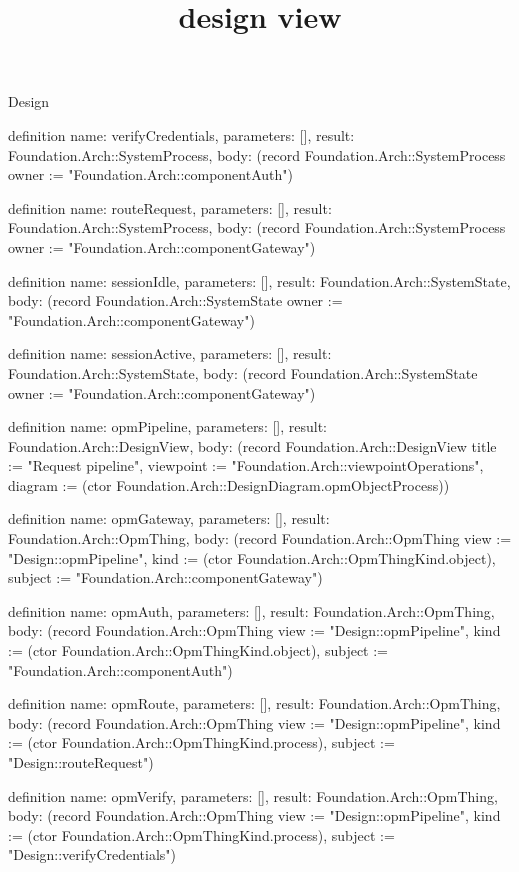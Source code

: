\begin{lexlean}{Design}
\title{design view}
\begin{semanticmodule}

definition{
  name: verifyCredentials,
  parameters: [],
  result: Foundation.Arch::SystemProcess,
  body: (record Foundation.Arch::SystemProcess {owner := "Foundation.Arch::componentAuth"})
}

definition{
  name: routeRequest,
  parameters: [],
  result: Foundation.Arch::SystemProcess,
  body: (record Foundation.Arch::SystemProcess {owner := "Foundation.Arch::componentGateway"})
}

definition{
  name: sessionIdle,
  parameters: [],
  result: Foundation.Arch::SystemState,
  body: (record Foundation.Arch::SystemState {owner := "Foundation.Arch::componentGateway"})
}

definition{
  name: sessionActive,
  parameters: [],
  result: Foundation.Arch::SystemState,
  body: (record Foundation.Arch::SystemState {owner := "Foundation.Arch::componentGateway"})
}

definition{
  name: opmPipeline,
  parameters: [],
  result: Foundation.Arch::DesignView,
  body: (record Foundation.Arch::DesignView {title := "Request pipeline", viewpoint := "Foundation.Arch::viewpointOperations", diagram := (ctor Foundation.Arch::DesignDiagram.opmObjectProcess)})
}

definition{
  name: opmGateway,
  parameters: [],
  result: Foundation.Arch::OpmThing,
  body: (record Foundation.Arch::OpmThing {view := "Design::opmPipeline", kind := (ctor Foundation.Arch::OpmThingKind.object), subject := "Foundation.Arch::componentGateway"})
}

definition{
  name: opmAuth,
  parameters: [],
  result: Foundation.Arch::OpmThing,
  body: (record Foundation.Arch::OpmThing {view := "Design::opmPipeline", kind := (ctor Foundation.Arch::OpmThingKind.object), subject := "Foundation.Arch::componentAuth"})
}

definition{
  name: opmRoute,
  parameters: [],
  result: Foundation.Arch::OpmThing,
  body: (record Foundation.Arch::OpmThing {view := "Design::opmPipeline", kind := (ctor Foundation.Arch::OpmThingKind.process), subject := "Design::routeRequest"})
}

definition{
  name: opmVerify,
  parameters: [],
  result: Foundation.Arch::OpmThing,
  body: (record Foundation.Arch::OpmThing {view := "Design::opmPipeline", kind := (ctor Foundation.Arch::OpmThingKind.process), subject := "Design::verifyCredentials"})
}


\end{semanticmodule}
\end{lexlean}
